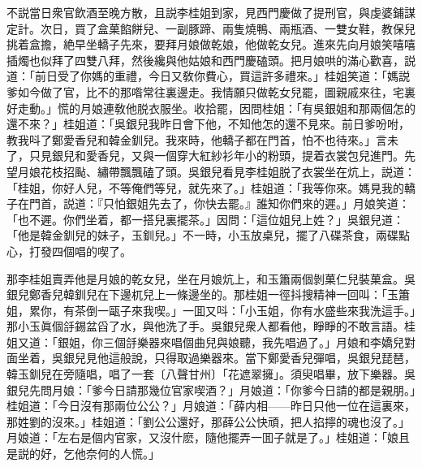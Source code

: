 不説當日衆官飲酒至晚方散，且説李桂姐到家，見西門慶做了提刑官，與虔婆鋪謀定計。次日，買了盒菓餡餅兒、一副豚蹄、兩隻燒鴨、兩瓶酒、一雙女鞋，教保兒挑着盒擔，絶早坐轎子先來，要拜月娘做乾娘，他做乾女兒。進來先向月娘笑嘻嘻插燭也似拜了四雙八拜，然後纔與他姑娘和西門慶磕頭。把月娘哄的滿心歡喜，説道：「前日受了你媽的重禮，今日又敎你費心，買這許多禮來。」桂姐笑道：「媽説爹如今做了官，比不的那喒常往裏邊走。我情願只做乾女兒罷，圖親戚來往，宅裏好走動。」慌的月娘連敎他脱衣服坐。收拾罷，因問桂姐：「有吳銀姐和那兩個怎的還不來？」桂姐道：「吳銀兒我昨日會下他，不知他怎的還不見來。前日爹吩咐，教我呌了鄭愛香兒和韓金釧兒。我來時，他轎子都在門首，怕不也待來。」言未了，只見銀兒和愛香兒，又與一個穿大紅紗衫年小的粉頭，提着衣裳包兒進門。先望月娘花枝招颭、繡帶飄飄磕了頭。吳銀兒看見李桂姐脱了衣裳坐在炕上，説道：「桂姐，你好人兒，不等俺們等兒，就先來了。」桂姐道：「我等你來。媽見我的轎子在門首，説道：『只怕銀姐先去了，你快去罷。』誰知你們來的遲。」月娘笑道：「也不遲。你們坐着，都一搭兒裏擺茶。」因問：「這位姐兒上姓？」吳銀兒道：「他是韓金釧兒的妹子，玉釧兒。」不一時，小玉放桌兒，擺了八碟茶食，兩碟點心，打發四個唱的喫了。

那李桂姐賣弄他是月娘的乾女兒，坐在月娘炕上，和玉簫兩個剝菓仁兒裝菓盒。吳銀兒鄭香兒韓釧兒在下邊杌兒上一條邊坐的。那桂姐一徑抖搜精神一回叫：「玉簫姐，累你，有茶倒一甌子來我喫。」一囬又呌：「小玉姐，你有水盛些來我洗這手。」那小玉眞個㧱錫盆舀了水，與他洗了手。吳銀兒衆人都看他，睜睜的不敢言語。桂姐又道：「銀姐，你三個㧱樂器來唱個曲兒與娘聽，我先唱過了。」月娘和李嬌兒對面坐着，吳銀兒見他這般說，只得取過樂器來。當下鄭愛香兒彈唱，吳銀兒琵琶，韓玉釧兒在旁隨唱，唱了一套〔八聲甘州〕「花遮翠擁」。須臾唱畢，放下樂器。吳銀兒先問月娘：「爹今日請那幾位官家喫酒？」月娘道：「你爹今日請的都是親朋。」桂姐道：「今日沒有那兩位公公？」月娘道：「薛内相——昨日只他一位在這裏來，那姓劉的沒來。」桂姐道：「劉公公還好，那薛公公快頑，把人掐擰的魂也沒了。」月娘道：「左右是個内官家，又沒什麽，隨他擺弄一囬子就是了。」桂姐道：「娘且是説的好，乞他奈何的人慌。」

